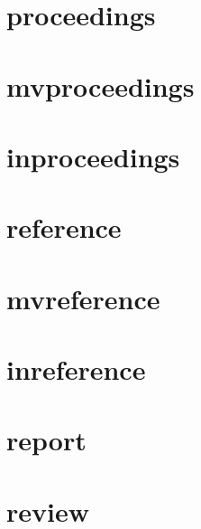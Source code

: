 \documentclass{article}
\begin{document}
\cite[1]{suppperiodical}

\cite[1]{suppperiodical}

\section{proceedings}

\cite[1]{proceedings}

\cite[1]{proceedings}

\section{mvproceedings}

\cite[1]{mvproceedings}

\cite[1]{mvproceedings}

\section{inproceedings}

\cite[1]{inproceedings}

\cite[1]{inproceedings}

\section{reference}

\cite[1]{reference}

\cite[1]{reference}

\section{mvreference}

\cite[1]{mvreference}

\cite[1]{mvreference}

\section{inreference}

\cite[1]{inreference}

\cite[1]{inreference}

\section{report}

\cite[1]{report}

\cite[1]{report}

\section{review}
\end{document}
